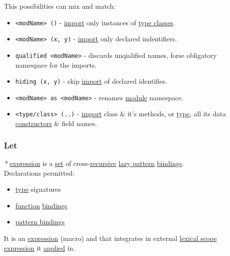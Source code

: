 \documentclass[11pt]{article}
\begin{document}
This possibilities can mix and match:\\
\begin{itemize}
\item \texttt{<modName> ()} - \hyperref[orge7bdadf]{import} only instances of \hyperref[orgead20df]{type classes}.\\
\item \texttt{<modName> (x, y)} - \hyperref[orge7bdadf]{import} only declared indentifiers.\\
\item \texttt{qualified <modName>} - discards unqialified names, forse obligatory namespace for the imports.\\
\item \texttt{hiding (x, y)} - skip \hyperref[orge7bdadf]{import} of declared identifies.\\
\item \texttt{<modName> as <modName>} - renames \hyperref[org5699463]{module} namespace.\\
\item \texttt{<type/class> (..)} - \hyperref[orge7bdadf]{import} class \& it's methods, or \hyperref[orgc4aea2f]{type}, all its data \hyperref[org7a9d75a]{constructors} \& field names.\\
\end{itemize}

\subsubsection{\label{org77c82c3}Let}
\label{sec:orgcab01d8}
\emph{*} \hyperref[org9021dd7]{expression} is a \hyperref[org1faf06d]{set} of cross-\hyperref[orgf513e66]{recursive} \hyperref[org618e055]{lazy pattern} \hyperref[org6f5e9e4]{bindings}.\\

Declarations permitted:\\
\begin{itemize}
\item \hyperref[orgc4aea2f]{type} signatures\\
\item \hyperref[orge15bc14]{function} \hyperref[org6f5e9e4]{bindings}\\
\item \hyperref[org4f6bef6]{pattern bindings}\\
\end{itemize}

It is an \hyperref[org9021dd7]{expression} (macro) and that integrates in external \hyperref[org6a58f4c]{lexical scope} \hyperref[org9021dd7]{expression} it \hyperref[org7abd585]{applied} in.\\
\end{document}
